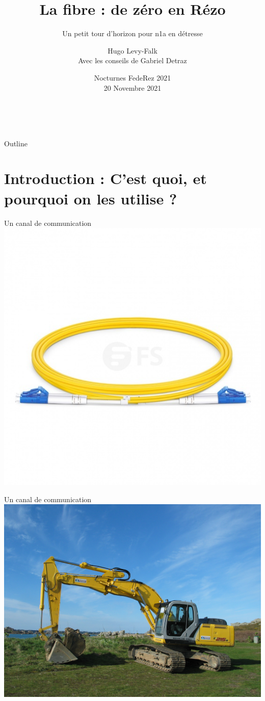 \documentclass[aspectratio=149, 10pt, t]{beamer}
\title[La fibre, de zéro en Rézo]{%
	\textbf{\usebeamerfont{structure}%
		La fibre : de zéro en Rézo%
	}%
}
\subtitle{Un petit tour d'horizon pour n1a en détresse}
\author{%
	Hugo Levy-Falk\\
	Avec les conseils de Gabriel Detraz
} %
\date{%
	Nocturnes FedeRez 2021 \\[\medskipamount]
	\textmd{20 Novembre 2021}%
}
\begin{document}
\begin{frame}[standout]{~}

	\titlepage%

\end{frame}


\begin{frame}[standout]{Outline}

	\medskip
	\tableofcontents

\end{frame}

\section{Introduction : C'est quoi, et pourquoi on les utilise ?}

\begin{frame}{Un canal de communication}
    \centering
    \includegraphics[height=\textheight]{images/une_fibre}
\end{frame}
\begin{frame}{Un canal de communication}
    \centering
    \includegraphics[width=0.7\linewidth]{images/Excavator_in_Brittany_France.JPG}
\end{frame}
\end{document}
